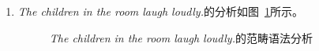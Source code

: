 \largerpage
\begin{enumerate}
\item \emph{The children in the room laugh loudly.}的分析如图~\ref{Abbildung-CG-Kinder-lachen-laut}所示。
\begin{figure}[H]
\centerline{%
}
\caption{\label{Abbildung-CG-Kinder-lachen-laut}\emph{The children in
    the room laugh loudly.}的范畴语法分析}
\end{figure}%


\end{enumerate}
